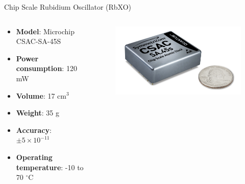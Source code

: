 \begin{frame}{Chip Scale Rubidium Oscillator (RbXO)}

    \begin{columns}[t]
        \begin{column}[t]{0.65\textwidth}
            \begin{itemize}
                \item \textbf{Model}: Microchip CSAC-SA-45S
                \vspace{0.2cm}
                \item \textbf{Power consumption}: 120 mW
                \vspace{0.2cm}
                \item \textbf{Volume}: 17 cm$^{3}$
                \vspace{0.2cm}
                \item \textbf{Weight}: 35 g
                \vspace{0.2cm}
                \item \textbf{Accuracy}: $\pm 5 \times 10^{-11}$
                \vspace{0.2cm}
                \item \textbf{Operating temperature}: -10 to 70 $^{\circ}$C
            \end{itemize}
        \end{column}
        \begin{column}[t]{0.5\textwidth}
            \begin{figure}[!ht]
                \begin{center}
                    \includegraphics[width=\columnwidth]{figures/microchip-csac}
                \end{center}
            \end{figure}
        \end{column}
    \end{columns}

\end{frame}

